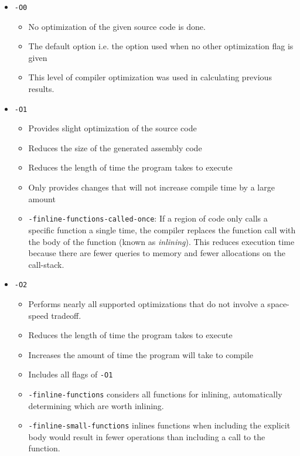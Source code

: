 \documentclass{article}
\begin{document}
        \begin{itemize}
            \item \verb|-O0|
                \begin{itemize}
                    \item No optimization of the given source code is done.
                    \item The default option i.e. the option used when no other optimization flag is given
                    \item This level of compiler optimization was used in calculating previous results.
                \end{itemize}
            \item \verb|-O1| 
                \begin{itemize}
                    \item Provides slight optimization of the source code
                    \item Reduces the size of the generated assembly code
                    \item Reduces the length of time the program takes to execute
                    \item Only provides changes that will not increase compile time by a large amount
                    \item \verb|-finline-functions-called-once|: If a region of code only calls a specific function a single time, the compiler replaces the function call with the body of the function (known as \emph{inlining}).  This reduces execution time because there are fewer queries to memory and fewer allocations on the call-stack.
                \end{itemize}
            \item \verb|-O2|
                \begin{itemize}
                    \item Performs nearly all supported optimizations that do not involve a space-speed tradeoff.
                    \item Reduces the length of time the program takes to execute
                    \item Increases the amount of time the program will take to compile
                    \item Includes all flags of \verb|-O1|
                    \item \verb|-finline-functions| considers all functions for inlining, automatically determining which are worth inlining.
                    \item \verb|-finline-small-functions| inlines functions when including the explicit body would result in fewer operations than including a call to the function.

\end{itemize}
\end{itemize}
\end{document}
